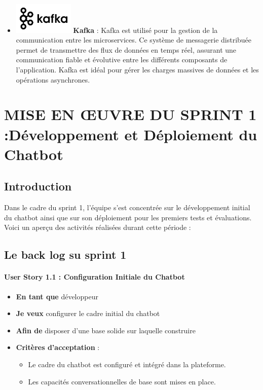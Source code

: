 \documentclass[a4paper, 11pt, openany]{report}
\begin{document}
\begin{itemize}
\item \includegraphics[height=1.5cm]{images/kafka.png} \hspace{5pt} \textbf{Kafka}  : 
Kafka est utilisé pour la gestion de la communication entre les microservices. Ce système de messagerie distribuée permet de transmettre des flux de données en temps réel, assurant une communication fiable et évolutive entre les différents composants de l'application. Kafka est idéal pour gérer les charges massives de données et les opérations asynchrones.

\end{itemize}

\chapter{MISE EN ŒUVRE DU SPRINT 1 :Développement et Déploiement du Chatbot}


\section{Introduction}
Dans le cadre du sprint 1, l'équipe s'est concentrée sur le développement initial du chatbot ainsi que sur son déploiement pour les premiers tests et évaluations. Voici un aperçu des activités réalisées durant cette période :


\section{Le back log su sprint 1}
\subsubsection{User Story 1.1 : Configuration Initiale du Chatbot}

\begin{itemize}
    \item \textbf{En tant que} développeur
    \item \textbf{Je veux} configurer le cadre initial du chatbot
    \item \textbf{Afin de} disposer d’une base solide sur laquelle construire
    \item \textbf{Critères d’acceptation} :
    \begin{itemize}
        \item Le cadre du chatbot est configuré et intégré dans la plateforme.
        \item Les capacités conversationnelles de base sont mises en place.
    \end{itemize}
\end{itemize}
\end{document}
